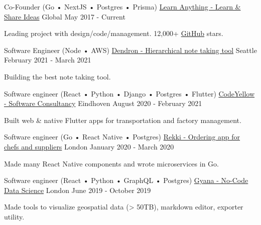 

\begin{cventries}

  \cventry
    {Co-Founder (Go • NextJS • Postgres • Prisma)}
    {\href{https://learn-anything.xyz}{Learn Anything - Learn \& Share Ideas}}
    {Global}
    {May 2017 - Current}
     {
      \begin{cvitems}
        \item {Leading project with design/code/management. 12,000+ \href{https://github.com/learn-anything/learn-anything}{GitHub} stars.}
      \end{cvitems}
    }

  \cventry
    {Software Engineer (Node • AWS)}
    {\href{https://dendron.so}{Dendron - Hierarchical note taking tool}}
    {Seattle}
    {February 2021 - March 2021}
     {
      \begin{cvitems}
        \item {Building the best note taking tool.}
      \end{cvitems}
    }

  \cventry
    {Software engineer (React • Python • Django • Postgres • Flutter)}
    {\href{https://codeyellow.nl}{CodeYellow - Software Consultancy}}
    {Eindhoven}
    {August 2020 - February 2021}
     {
      \begin{cvitems}
        \item {Built web \& native Flutter apps for transportation and factory management.}
      \end{cvitems}
    }

  \cventry
    {Software engineer (Go • React Native • Postgres)}
    {\href{https://www.rekki.com}{Rekki - Ordering app for chefs and suppliers}}
    {London}
    {January 2020 - March 2020}
     {
      \begin{cvitems}
        \item {Made many React Native components and wrote microservices in Go.}
      \end{cvitems}
    }

  \cventry
    {Software engineer (React • Python • GraphQL • Postgres)}
    {\href{https://www.gyana.com}{Gyana - No-Code Data Science}}
    {London}
    {June 2019 - October 2019}
     {
      \begin{cvitems}
        \item {Made tools to visualize geospatial data (> 50TB), markdown editor, exporter utility.}
      \end{cvitems}
    }


\end{cventries}
